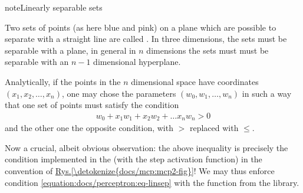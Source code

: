 \documentclass[a4paper,12pt,polish]{jupyterBook}
\begin{document}
\begin{sphinxVerbatimOutput}

\noindent{}
\end{sphinxVerbatimOutput}

\begin{sphinxadmonition}{note}{Linearly separable sets}

\sphinxAtStartPar
Two sets of points (as here blue and pink) on a plane which are possible to separate with a straight line are called . In three dimensions, the sets must be separable with a plane, in general in \(n\) dimensions the sets must must be separable with an \(n-1\) dimensional hyperplane.
\end{sphinxadmonition}

\sphinxAtStartPar
Analytically, if the points in the \(n\) dimensional space have coordinates \((x_1,x_2,\dots,x_n)\), one may chose the parameters \((w_0,w_1,\dots,w_n)\) in such a way that one set of points must satisfy the condition
\begin{equation}\label{equation:docs/perceptron:eq-linsep}
\begin{split}w_0+x_1 w_1+x_2 w_2 + \dots x_n w_n > 0\end{split}
\end{equation}
\sphinxAtStartPar
and the other one the opposite condition, with \(>\) replaced with \(\le\).

\sphinxAtStartPar
Now a crucial, albeit obvious observation: the above inequality is precisely the condition implemented in the {\hyperref[\detokenize{docs/mcp:mcp-lab}]{}} (with the step activation function) in the convention of \hyperref[\detokenize{docs/mcp:mcp2-fig}]{Rys.\@ \ref{\detokenize{docs/mcp:mcp2-fig}}}! We may thus enforce condition \eqref{equation:docs/perceptron:eq-linsep} with the  function from the  library.
\end{document}
